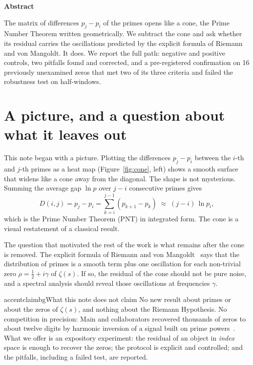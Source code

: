 \documentclass[11pt,a4paper]{article}
\begin{document}
\vspace{2mm}
{\sffamily\bfseries\normalsize Abstract\par}
\vspace{1mm}
The matrix of differences $p_j-p_i$ of the primes opens like a cone, the Prime Number Theorem written geometrically. We subtract the cone and ask whether its residual carries the oscillations predicted by the explicit formula of Riemann and von Mangoldt. It does. We report the full path: negative and positive controls, two pitfalls found and corrected, and a pre-registered confirmation on 16 previously unexamined zeros that met two of its three criteria and failed the robustness test on half-windows.

\clearpage

\section{A picture, and a question about what it leaves out}

This note began with a picture. Plotting the differences $p_j-p_i$ between the $i$-th and $j$-th primes as a heat map (Figure~\ref{fig:cone}, left) shows a smooth surface that widens like a cone away from the diagonal. The shape is not mysterious. Summing the average gap $\ln p$ over $j-i$ consecutive primes gives
\begin{equation}\label{eq:cone}
D(i,j)=p_j-p_i=\sum_{k=i}^{j-1}\left(p_{k+1}-p_k\right)\;\approx\;(j-i)\,\ln p_i,
\end{equation}
which is the Prime Number Theorem (PNT) in integrated form. The cone is a visual restatement of a classical result.

The question that motivated the rest of the work is what remains after the cone is removed. The explicit formula of Riemann and von Mangoldt~\cite{vm} says that the distribution of primes is a smooth term plus one oscillation for each non-trivial zero $\rho=\tfrac12+i\gamma$ of $\zeta(s)$. If so, the residual of the cone should not be pure noise, and a spectral analysis should reveal those oscillations at frequencies $\gamma$.

\begin{notebox}{accent}{claimbg}{What this note does not claim}
No new result about primes or about the zeros of $\zeta(s)$, and nothing about the Riemann Hypothesis. No competition in precision: Main and collaborators recovered thousands of zeros to about twelve digits by harmonic inversion of a signal built on prime powers~\cite{main}. What we offer is an expository experiment: the residual of an object in \emph{index} space is enough to recover the zeros; the protocol is explicit and controlled; and the pitfalls, including a failed test, are reported.
\end{notebox}
\end{document}
